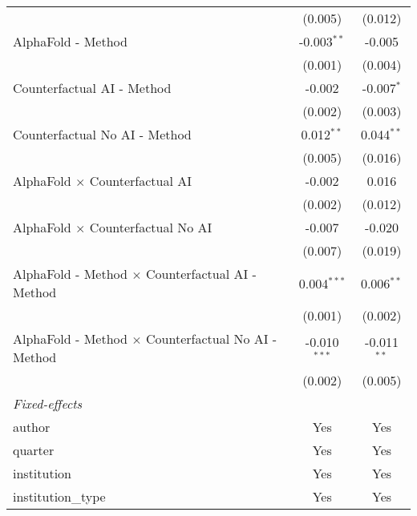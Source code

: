 \begin{tabular}{lcc}
                                                              & (0.005)        & (0.012)\\   
   AlphaFold - Method                                         & -0.003$^{**}$  & -0.005\\   
                                                              & (0.001)        & (0.004)\\   
   Counterfactual AI - Method                                 & -0.002         & -0.007$^{*}$\\   
                                                              & (0.002)        & (0.003)\\   
   Counterfactual No AI - Method                              & 0.012$^{**}$   & 0.044$^{**}$\\   
                                                              & (0.005)        & (0.016)\\   
   AlphaFold $\times$ Counterfactual AI                       & -0.002         & 0.016\\   
                                                              & (0.002)        & (0.012)\\   
   AlphaFold $\times$ Counterfactual No AI                    & -0.007         & -0.020\\   
                                                              & (0.007)        & (0.019)\\   
   AlphaFold - Method $\times$ Counterfactual AI - Method     & 0.004$^{***}$  & 0.006$^{**}$\\   
                                                              & (0.001)        & (0.002)\\   
   AlphaFold - Method $\times$ Counterfactual No AI - Method  & -0.010$^{***}$ & -0.011$^{**}$\\   
                                                              & (0.002)        & (0.005)\\   
   \midrule
   \emph{Fixed-effects}\\
   author                                                     & Yes            & Yes\\  
   quarter                                                    & Yes            & Yes\\  
   institution                                                & Yes            & Yes\\  
   institution\_type                                          & Yes            & Yes\\  

\end{tabular}
